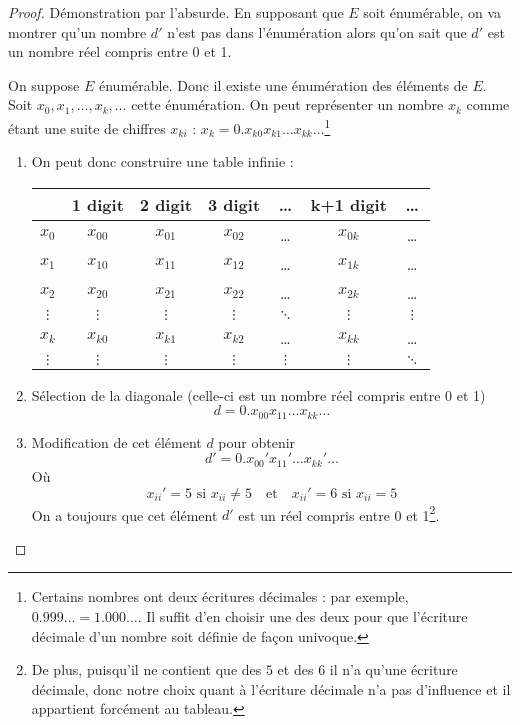 \begin{myexem}
\begin{mytheo}
	\begin{proof}
		Démonstration par l'absurde.  En supposant que $E$ soit énumérable, on va montrer qu'un nombre $d'$ n'est pas dans l'énumération alors qu'on sait
		que $d'$ est un nombre réel compris entre 0 et 1.

		On suppose $E$ énumérable. Donc il existe une énumération des éléments de $E$.  Soit
		$x_0, x_1,\dots,x_k,\dots$ cette énumération. On peut représenter un nombre $x_k$ comme étant une
		suite de chiffres $x_{ki}$ : $x_k = 0.x_{k0}x_{k1}\dots x_{kk}\dots$\footnote{Certains nombres ont deux écritures décimales : par exemple, $0.999\ldots = 1.000\ldots$. Il suffit d'en choisir une des deux pour que l'écriture décimale d'un nombre soit définie de façon univoque.}

		\begin{enumerate}
			\item On peut donc construire une table infinie : \\
				\begin{tabular}{|c||c|c|c|c|c|c|}
					\hline
					& 1 digit & 2 digit & 3 digit & \dots & k+1 digit & \dots \\
					\hline
					$x_0$ & $x_{00}$ & $x_{01}$ & $x_{02}$ & \dots & $x_{0k}$ & \dots \\
					$x_1$ & $x_{10}$ & $x_{11}$ & $x_{12}$ & \dots & $x_{1k}$ & \dots \\
					$x_2$ & $x_{20}$ & $x_{21}$ & $x_{22}$ & \dots & $x_{2k}$ & \dots \\
					$\vdots$& $\vdots$& $\vdots$& $\vdots$& $\ddots$& $\vdots$& $\vdots$\\
					$x_k$ & $x_{k0}$ & $x_{k1}$ & $x_{k2}$ & \dots & $x_{kk}$ & \dots \\
					$\vdots$& $\vdots$& $\vdots$& $\vdots$& $\vdots$& $\vdots$& $\ddots$\\
					\hline
				\end{tabular}
			\item Sélection de la diagonale (celle-ci est un nombre réel compris
				entre 0 et 1)
				\[ d=0.x_{00}x_{11}\dots x_{kk}\dots \]
			\item Modification de cet élément $d$ pour obtenir
				\[ d'=0.x_{00}'x_{11}'\dots x_{kk}'\dots \]
				Où
                $$x_{ii}'=5\text{ si }x_{ii}\neq 5\quad\text{et}\quad x_{ii}'=6\text{ si }x_{ii}= 5$$
				On a toujours que cet élément $d'$ est un réel compris entre 0 et 1\footnote{De plus, puisqu'il ne contient que des $5$ et des $6$ il n'a qu'une écriture décimale, donc notre choix quant à l'écriture décimale n'a pas d'influence et il appartient forcément au tableau.}.

\end{enumerate}
\end{proof}
\end{mytheo}
\end{myexem}
